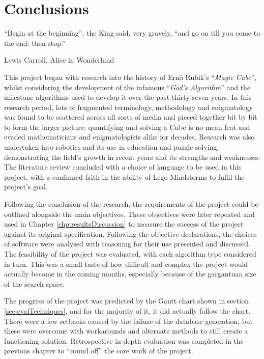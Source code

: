\documentclass{report}
\newcommand{\tit}[1]{\textit{#1}}
\newcommand{\propernoun}[1]{\enquote{\tit{#1}}}
\begin{document}
    \newpage
    \chapter{Conclusions}
   	\epigraph{``Begin at the beginning'', the King said, very gravely, ``and go on till you come to the end: then stop.''}{Lewis Carroll, Alice in Wonderland \cite{Carroll1865}}
    
    This project began with research into the history of Ern\"{o} Rubik's \propernoun{Magic Cube}, whilst considering the development of the infamous \propernoun{God's Algorithm} and the milestone algorithms used to develop it over the past thirty-seven years. In this research period, lots of fragmented terminology, methodology and enigmatology was found to be scattered across all sorts of media and pieced together bit by bit to form the larger picture: quantifying and solving a Cube is no mean feat and evaded mathematicians and enigmatologists alike for decades. Research was also undertaken into robotics and its use in education and puzzle solving, demonstrating the field's growth in recent years and its strengths and weaknesses. The literature review concluded with a choice of language to be used in this project, with a confirmed faith in the ability of Lego Mindstorms to fulfil the project's goal.
    
    Following the conclusion of the research, the requirements of the project could be outlined alongside the main objectives. These objectives were later repeated and used in Chapter \ref{chp:resultsDiscussion} to measure the success of the project against its original specification. Following the objective declarations, the choices of software were analysed with reasoning for their use presented and discussed. The feasibility of the project was evaluated, with each algorithm type considered in turn. This was a small taste of how difficult and complex the project would actually become in the coming months, especially because of the gargantuan size of the search space.
    
    The progress of the project was predicted by the Gantt chart shown in section \ref{sec:evalTechniques}, and for the majority of it, it did actually follow the chart. There were a few setbacks caused by the failure of the database generation, but these were overcome with workarounds and alternate methods to still create a functioning solution. Retrospective in-depth evaluation was completed in the previous chapter to \enquote{round off} the core work of the project.
    
\end{document}
